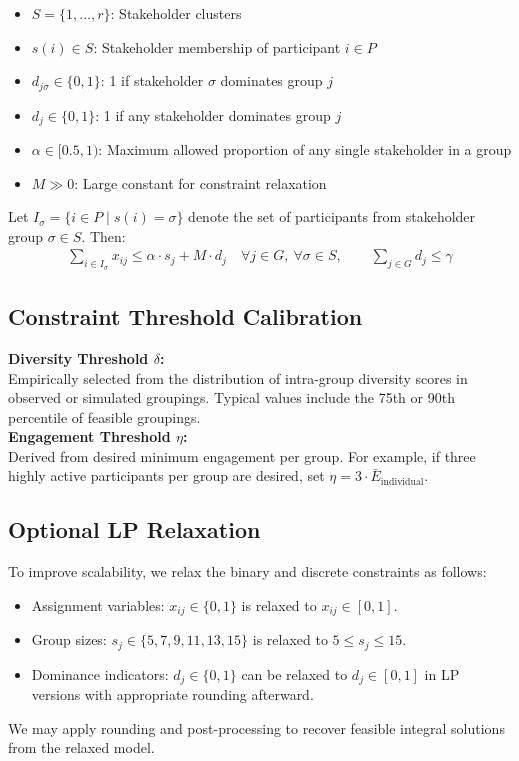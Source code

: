 \begin{itemize}
    \item $S = \{1, \dots, r\}$: Stakeholder clusters
    \item $s(i) \in S$: Stakeholder membership of participant $i \in P$
    \item $d_{j\sigma} \in \{0,1\}$: 1 if stakeholder $\sigma$ dominates group $j$
    \item $d_j \in \{0,1\}$: 1 if any stakeholder dominates group $j$
    \item $\alpha \in [0.5, 1)$: Maximum allowed proportion of any single stakeholder in a group
    \item $M \gg 0$: Large constant for constraint relaxation
\end{itemize}

Let \(I_\sigma = \{i \in P \mid s(i) = \sigma\}\) denote the set of participants from stakeholder group \(\sigma \in S\).
Then:
\begin{gather*}
    \sum_{i \in I_\sigma} x_{ij} \leq \alpha \cdot s_j + M \cdot d_j \quad \forall j \in G,\ \forall \sigma \in S,
    \qquad    \sum_{j \in G} d_j \leq \gamma
\end{gather*}
\noindent

\subsection*{Constraint Threshold Calibration}
\textbf{Diversity Threshold \(\delta\):}\\[3pt]
Empirically selected from the distribution of intra-group diversity scores in observed or simulated groupings.
Typical values include the 75th or 90th percentile of feasible groupings.
\\
\noindent
\textbf{Engagement Threshold \(\eta\):}\\[3pt]
Derived from desired minimum engagement per group.
For example, if three highly active participants per group are desired,
set \(\eta = 3 \cdot \bar{E}_{\text{individual}}\).

\subsection*{Optional LP Relaxation}

To improve scalability, we relax the binary and discrete constraints as follows:
\begin{itemize}
    \item Assignment variables: \quad $x_{ij} \in \{0,1\}$ is relaxed to $x_{ij} \in [0,1]$.
    \item Group sizes: \quad $s_j \in \{5,7,9,11,13,15\}$ is relaxed to $5 \leq s_j \leq 15$.
    \item Dominance indicators: \quad $d_j \in \{0,1\}$ can be relaxed to $d_j \in [0,1]$ in LP versions with appropriate rounding afterward.
\end{itemize}
We may apply rounding and post-processing to recover feasible integral solutions from the relaxed model.
